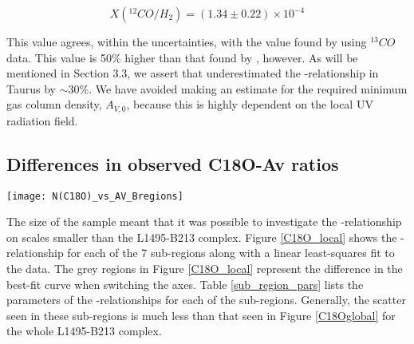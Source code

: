 \documentclass{aa}
\begin{document}
\begin{equation}
X(^{12}CO/H_2)=(1.34 \pm 0.22) \times 10^{-4}
\end{equation}

This value agrees, within the uncertainties, with the value found by \citet{pineda10} using $^{13}CO$ data. This value is 50\% higher than that found by \citet{frerking82}, however. As will be mentioned in Section 3.3, we assert that \citet{frerking82} underestimated the \eco-\htwo relationship in Taurus by $\sim$30\%. We have avoided making an estimate for the required minimum gas column density, $A_{V,0}$, because this is highly dependent on the local UV radiation field.


\subsection{Differences in observed C18O-Av ratios}

    \begin{figure*}
    \centering
    \texttt{[image: N(C18O)\_vs\_AV\_Bregions]}
    \caption{The \neco-\av relationship for each of the sub-regions in the L1495-B213 complex. The average uncertainty in the \eco column density is 3\% while the nominal uncertainty for the extinction measurements is 17\%. Even though the scatter appears to be large it should be noted that in each sub-region between 66\% and 83\% of the data points lie within the solid black cloud located along the line of best-fit. It is clear that the B7 region is the main contributor to the noise seen in the global relationship. In general, the \neco-\av relationship in linear in all sub-regions and shows no signs of saturation with in the range of extinction probed.}
    \label{C18O_local}
    \end{figure*}

The size of the sample meant that it was possible to investigate the \neco-\av relationship on scales smaller than the L1495-B213 complex. Figure \ref{C18O_local} shows the \neco-\av relationship for each of the 7 sub-regions along with a linear least-squares fit to the data. The grey regions in Figure \ref{C18O_local} represent the difference in the best-fit curve when switching the axes. Table \ref{sub_region_pars} lists the parameters of the \neco -\av relationships for each of the sub-regions. Generally, the scatter seen in these sub-regions is much less than that seen in Figure \ref{C18Oglobal} for the whole L1495-B213 complex.
\end{document}
